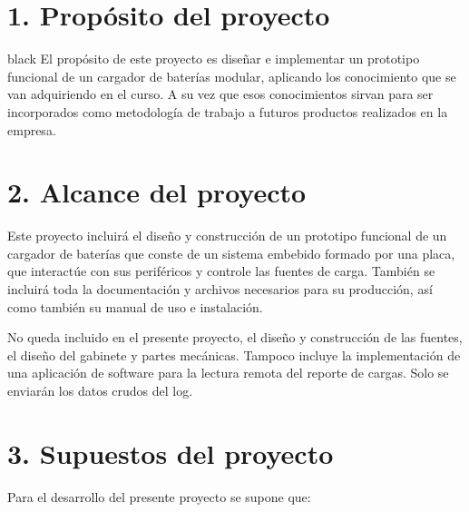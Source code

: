 \documentclass[11pt]{charter}
\begin{document}
\section{1. Propósito del proyecto}
\label{sec:proposito}

\begin{consigna}{black}
El propósito de este proyecto es diseñar e implementar un prototipo funcional de un cargador de baterías modular, aplicando los conocimiento que se van adquiriendo en el curso. A su vez que esos conocimientos sirvan para ser incorporados como metodología de trabajo a futuros productos realizados en la empresa.
\end{consigna}

\section{2. Alcance del proyecto}
\label{sec:alcance}

Este proyecto incluirá el diseño y construcción de un prototipo funcional de un cargador de baterías que conste de un sistema embebido formado por una placa, que interactúe con sus periféricos y controle las fuentes de carga. También  se incluirá toda la documentación y archivos necesarios para su producción, así como también su manual de uso e instalación.

No queda incluido en el presente proyecto, el diseño y construcción de las fuentes, el diseño del gabinete y partes mecánicas. Tampoco incluye la implementación de una aplicación de software para la lectura remota del reporte de cargas. Solo se enviarán los datos crudos del log.


\section{3. Supuestos del proyecto}
\label{sec:supuestos}

Para el desarrollo del presente proyecto se supone que: 
\end{document}
